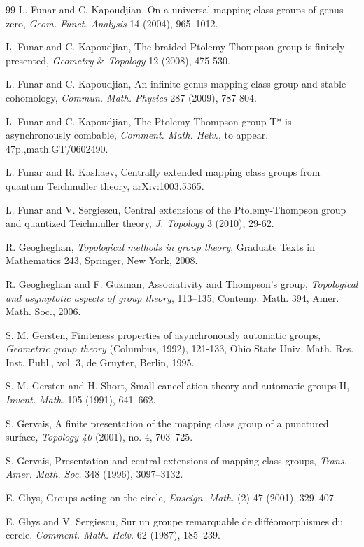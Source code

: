\documentclass[twoside]{irmaems}
\theoremstyle{plain}
\theoremstyle{definition}
\theoremstyle{remark}
\begin{document}
\begin{small}
\begin{thebibliography}{99}
L. Funar and C. Kapoudjian, {On a universal mapping class groups of genus
zero}, {\em Geom. Funct. Analysis} 14 (2004), 965--1012.

L. Funar and C. Kapoudjian, {The braided Ptolemy-Thompson group is finitely presented}, {\em Geometry $\&$ Topology} 12 (2008), 475-530. 

L. Funar and C. Kapoudjian, { An infinite genus mapping class group and stable cohomology, }{\em Commun. Math. Physics} 287 (2009), 787-804.

L. Funar and C. Kapoudjian, {
The Ptolemy-Thompson group T* is asynchronously combable}, 
{\em Comment. Math. Helv.}, to appear, 47p.,math.GT/0602490. 


L. Funar and R. Kashaev,   Centrally extended mapping class groups from quantum Teichmuller theory,  arXiv:1003.5365. 

L. Funar and 
V. Sergiescu, {  Central extensions of the Ptolemy-Thompson group and quantized Teichmuller theory}, {\em  J. Topology} 3 (2010), 29-62.

R. Geogheghan, {\em Topological methods in group theory}, 
{Graduate Texts in Mathematics}
 243,  Springer, New York, 2008. 

R. Geogheghan and F. Guzman, Associativity and Thompson's
group, {\em Topological and asymptotic aspects of group theory}, 113--135, 
Contemp. Math. 394, Amer. Math. Soc., 2006.


S. M. Gersten, { Finiteness properties of asynchronously 
automatic groups},   {\em Geometric group theory} (Columbus, 1992),  
121-133, Ohio State Univ. Math. Res. Inst. Publ., 
vol. 3, de Gruyter, Berlin, 1995.


S. M. Gersten and H. Short, { 
Small cancellation theory and automatic groups II},
{\em Invent. Math.} 105 (1991), 641--662.


S. Gervais, { A finite presentation of the mapping class group of a 
punctured surface}, {\em  Topology  40}  (2001),  no. 4, 703--725. 


S. Gervais, { Presentation and central extensions of mapping class groups},  {\em Trans. Amer. Math. Soc.}  348  (1996),   3097--3132.


E. Ghys, Groups acting on the circle, {\em Enseign. Math.} (2) 47 (2001), 
329--407. 

E. Ghys and V. Sergiescu, {Sur un groupe remarquable de
diff\'eomorphismes du cercle}, {\em   Comment. Math. Helv.} {62} (1987), 185--239.


\end{thebibliography}
\end{small}
\end{document}
